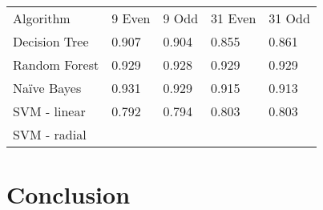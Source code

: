\documentclass[aps, reprint, amsmath, amssymb]{revtex4-1}
\begin{document}
\begin{center}
  \begin{tabular}{ | l || l | l | l | l |}
    \hline
    Algorithm & 9 Even & 9 Odd & 31 Even & 31 Odd \\ \hhline{|=||=|=|=|=|}

    Decision Tree & 0.907 & 0.904 & 0.855 & 0.861 \\ \hline

    Random Forest & 0.929 & 0.928  & 0.929  & 0.929 \\ \hline

    Na{\"i}ve Bayes & 0.931  & 0.929 & 0.915 & 0.913 \\ \hline

    SVM - linear & 0.792 & 0.794 & 0.803 & 0.803 \\ \hline

    SVM - radial & & & & \\ 
    \hline
  \end{tabular}
\end{center}



\section{Conclusion}
\end{document}
